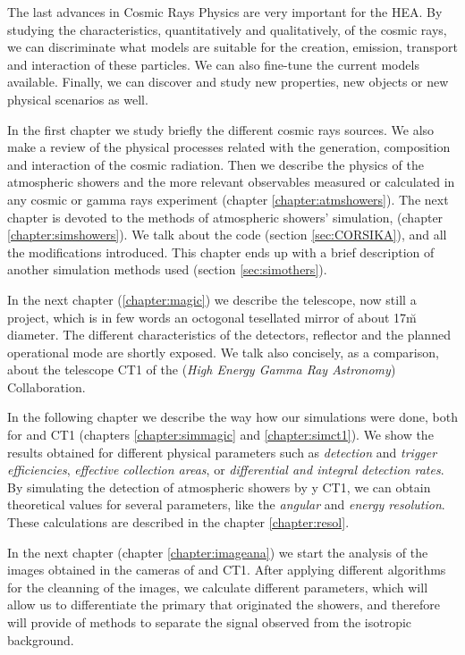 The last advances in Cosmic Rays Physics are very important for the
HEA. By studying the characteristics, quantitatively and
qualitatively, of the cosmic rays, we can discriminate what models are
suitable for the creation, emission, transport and interaction of
these particles. We can also fine-tune the current models available.
Finally, we can discover and study new properties, new objects or new
physical scenarios as well.

In the first chapter we study briefly the different cosmic rays
sources. We also make a review of the physical processes related with
the generation, composition and interaction of the cosmic radiation.
Then we describe the physics of the atmospheric showers and the more
relevant observables measured or calculated in any cosmic or gamma
rays experiment (chapter \ref{chapter:atmshowers}). The next chapter
is devoted to the methods of atmospheric showers' simulation, (chapter
\ref{chapter:simshowers}).  We talk about the \CORSIKA code (section
\ref{sec:CORSIKA}), and all the modifications introduced. This chapter
ends up with a brief description of another simulation methods used
(section \ref{sec:simothers}).

In the next chapter (\ref{chapter:magic}) we describe the \MAGIC
telescope, now still a project, which is in few words an octogonal
tesellated mirror of about 17\u{m} diameter. The different
characteristics of the detectors, reflector and the planned
operational mode are shortly exposed. We talk also concisely, as a
comparison, about the telescope CT1 of the \HEGRA ({\itshape High
  Energy Gamma Ray Astronomy}) Collaboration.

In the following chapter we describe the way how our simulations were
done, both for \MAGIC and CT1 (chapters \ref{chapter:simmagic} and
\ref{chapter:simct1}). We show the results obtained for different
physical parameters such as \emph{detection} and \emph{trigger
  efficiencies}, \emph{effective collection areas}, or
\emph{differential and integral detection rates}. By simulating the
detection of atmospheric showers by \MAGIC y CT1, we can obtain
theoretical values for several parameters, like the \emph{angular} and
\emph{energy resolution}. These calculations are described in the
chapter \ref{chapter:resol}.

In the next chapter (chapter \ref{chapter:imageana}) we start the
analysis of the images obtained in the cameras of \MAGIC and CT1.
After applying different algorithms for the cleanning of the images,
we calculate different parameters, which will allow us to
differentiate the primary that originated the showers, and therefore
will provide of methods to separate the signal observed from the
isotropic background.

